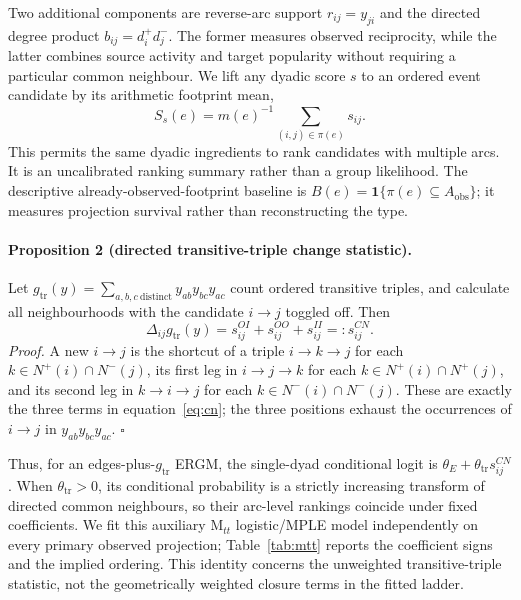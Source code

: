 \documentclass[10pt]{article}
\newcommand{\ind}{\mathbf{1}}
\begin{document}
Two additional components are reverse-arc support $r_{ij}=y_{ji}$ and the directed degree product $b_{ij}=d_i^+d_j^-$. The former measures observed reciprocity, while the latter combines source activity and target popularity without requiring a particular common neighbour. We lift any dyadic score $s$ to an ordered event candidate by its arithmetic footprint mean,
\begin{equation}
S_s(e)=m(e)^{-1}\sum_{(i,j)\in\pi(e)}s_{ij}.
\label{eq:lift}
\end{equation}
This permits the same dyadic ingredients to rank candidates with multiple arcs. It is an uncalibrated ranking summary rather than a group likelihood. The descriptive already-observed-footprint baseline is $B(e)=\ind\{\pi(e)\subseteq A_{\mathrm{obs}}\}$; it measures projection survival rather than reconstructing the type.

\paragraph{Proposition 2 (directed transitive-triple change statistic).}
Let $g_{\mathrm{tr}}(y)=\sum_{a,b,c\ \mathrm{distinct}}y_{ab}y_{bc}y_{ac}$ count ordered transitive triples, and calculate all neighbourhoods with the candidate $i\to j$ toggled off.  Then
\begin{equation}
 \Delta_{ij}g_{\mathrm{tr}}(y)=s^{OI}_{ij}+s^{OO}_{ij}+s^{II}_{ij}=:s^{CN}_{ij}.
 \label{eq:ttripleidentity}
\end{equation}
\emph{Proof.}  A new $i\to j$ is the shortcut of a triple $i\to k\to j$ for each $k\in N^+(i)\cap N^-(j)$, its first leg in $i\to j\to k$ for each $k\in N^+(i)\cap N^+(j)$, and its second leg in $k\to i\to j$ for each $k\in N^-(i)\cap N^-(j)$.  These are exactly the three terms in equation~\eqref{eq:cn}; the three positions exhaust the occurrences of $i\to j$ in $y_{ab}y_{bc}y_{ac}$.  \hfill$\square$

Thus, for an edges-plus-$g_{\mathrm{tr}}$ ERGM, the single-dyad conditional logit is $\theta_E+\theta_{\mathrm{tr}}s^{CN}_{ij}$.  When $\theta_{\mathrm{tr}}>0$, its conditional probability is a strictly increasing transform of directed common neighbours, so their arc-level rankings coincide under fixed coefficients. We fit this auxiliary $\mathrm{M}_{tt}$ logistic/MPLE model independently on every primary observed projection; Table~\ref{tab:mtt} reports the coefficient signs and the implied ordering. This identity concerns the unweighted transitive-triple statistic, not the geometrically weighted closure terms in the fitted ladder.
\end{document}
